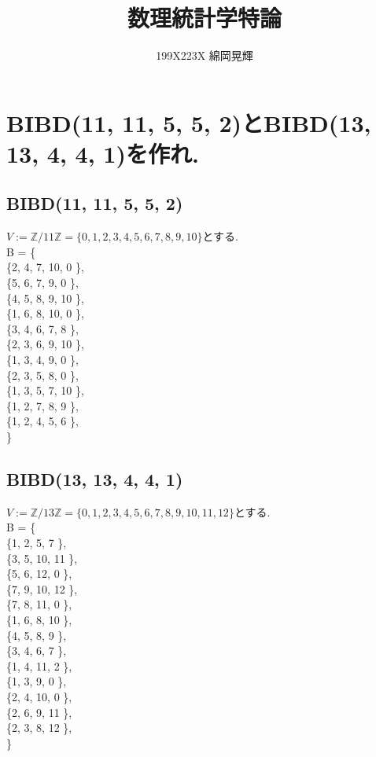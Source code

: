 \documentclass[uplatex]{jsarticle}
\title{\huge 数理統計学特論}
\author{199X223X 綿岡晃輝}
\affil{神戸大学大学院 システム情報学研究科 計算科学専攻}
\date{}
\begin{document}
    \maketitle
    \newpage
    
    \section{BIBD(11, 11, 5, 5, 2)とBIBD(13, 13, 4, 4, 1)を作れ.}
    \subsection{BIBD(11, 11, 5, 5, 2)}
    $V := \mathbb{Z}/11\mathbb{Z}=\{0, 1, 2, 3, 4, 5, 6, 7, 8, 9, 10\}$とする. \\
    B = \{ \\
    \{2,    4,    7,   10,   0 \}, \\ 
    \{5,    6,    7,    9,   0 \}, \\ 
    \{4,    5,    8,    9,  10 \}, \\
    \{1,    6,    8,   10,   0 \}, \\ 
    \{3,    4,    6,    7,   8 \}, \\
    \{2,    3,    6,    9,  10 \}, \\
    \{1,    3,    4,    9,   0 \}, \\ 
    \{2,    3,    5,    8,   0 \}, \\ 
    \{1,    3,    5,    7,  10 \}, \\
    \{1,    2,    7,    8,   9 \}, \\
    \{1,    2,    4,    5,   6 \}, \\
    \}

    \subsection{BIBD(13, 13, 4, 4, 1)}
    $V := \mathbb{Z}/13\mathbb{Z}=\{0, 1, 2, 3, 4, 5, 6, 7, 8, 9, 10, 11, 12\}$とする. \\
    B = \{ \\
    \{1,    2,    5,   7 \}, \\
    \{3,    5,   10,  11 \}, \\
    \{5,    6,   12,   0 \}, \\
    \{7,    9,   10,  12 \}, \\
    \{7,    8,   11,   0 \}, \\
    \{1,    6,    8,  10 \}, \\
    \{4,    5,    8,   9 \}, \\
    \{3,    4,    6,   7 \}, \\
    \{1,    4,   11,   2 \}, \\
    \{1,    3,    9,   0 \}, \\
    \{2,    4,   10,   0 \}, \\
    \{2,    6,    9,  11 \}, \\
    \{2,    3,    8,  12 \}, \\
    \}
\end{document}
